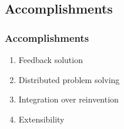 \subsection{Accomplishments}
\begin{frame}\frametitle{Accomplishments}
    \begin{enumerate}
        \item Feedback solution
        \item Distributed problem solving
        \item Integration over reinvention
        \item Extensibility
    \end{enumerate}
\end{frame}